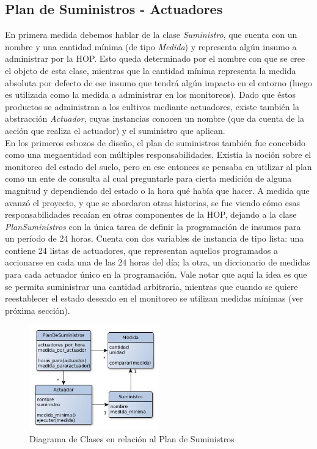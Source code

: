 \subsection{Plan de Suministros - Actuadores}

En primera medida debemos hablar de la clase \textsl{Suministro}, que cuenta con un nombre y una cantidad mínima (de tipo \textsl{Medida}) y representa algún insumo a administrar por la HOP. Esto queda determinado por el nombre con que se cree el objeto de esta clase, mientras que la cantidad mínima representa la medida absoluta por defecto de ese insumo que tendrá algún impacto en el entorno (luego es utilizada como la medida a administrar en los monitoreos). Dado que éstos productos se administran a los cultivos mediante actuadores, existe también la abstracción \textsl{Actuador}, cuyas instancias conocen un nombre (que da cuenta de la acción que realiza el actuador) y el suministro que aplican.\\
\indent En los primeros esbozos de diseño, el plan de suministros también fue concebido como una megaentidad con múltiples responsabilidades. Existía la noción sobre el monitoreo del estado del suelo, pero en ese entonces se pensaba en utilizar al plan como un ente de consulta al cual preguntarle para cierta medición de alguna magnitud y dependiendo del estado o la hora qué había que hacer. A medida que avanzó el proyecto, y que se abordaron otras historias, se fue viendo cómo esas responsabilidades recaían en otras componentes de la HOP, dejando a la clase \textsl{PlanSuministros} con la única tarea de definir la programación de insumos para un período de 24 horas. Cuenta con dos variables de instancia de tipo lista: una contiene 24 listas de actuadores, que representan aquellos programados a accionarse en cada una de las 24 horas del día; la otra, un diccionario de medidas para cada actuador único en la programación. Vale notar que aquí la idea es que se permita suministrar una cantidad arbitraria, mientras que cuando se quiere reestablecer el estado deseado en el monitoreo se utilizan medidas mínimas (ver próxima sección).

\begin{figure}[h!]
  \centering
  \includegraphics[width=0.5\textwidth]{./imagenes/clases4.jpg}
  \caption{Diagrama de Clases en relación al Plan de Suministros}
  \label{fig:clases4}
\end{figure}



